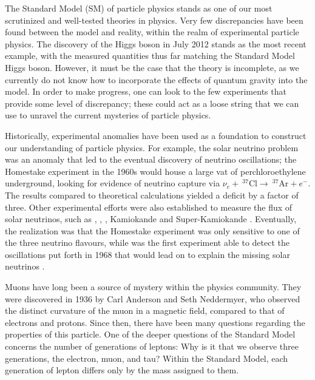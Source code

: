 \label{chapter:introduction}

The Standard Model (SM) of particle physics stands as one of our most scrutinized and well-tested theories in physics.
Very few discrepancies have been found between the model and reality, within the realm of experimental particle physics.
The discovery of the Higgs boson in July 2012 stands as the most recent example, with the measured quantities thus far matching the Standard Model Higgs boson.
However, it must be the case that the theory is incomplete, as we currently do not know how to incorporate the effects of quantum gravity into the model.
In order to make progress, one can look to the few experiments that provide some level of discrepancy; these could act as a loose string that we can use to unravel the current mysteries of particle physics.

Historically, experimental anomalies have been used as a foundation to construct our understanding of particle physics.
For example, the solar neutrino problem was an anomaly that led to the eventual discovery of neutrino oscillations; the Homestake experiment \cite{Davis:1968cp} in the 1960s would house a large vat of perchloroethylene underground, looking for evidence of neutrino capture via $\nu_e +~^{37}\textrm{Cl} \rightarrow~^{37}\textrm{Ar} + e^-$.
The results compared to theoretical calculations yielded a deficit by a factor of three.
Other experimental efforts were also established to measure the flux of solar neutrinos, such as \sage \cite{Abdurashitov:1999zd}, \gallex \cite{Hampel:1998xg}, \sno \cite{Boger:1999bb}, Kamiokande and Super-Kamiokande \cite{Fukuda:1996sz, Fukuda:2002pe}.
Eventually, the realization was that the Homestake experiment was only sensitive to one of the three neutrino flavours, while \sno was the first experiment able to detect the oscillations put forth in 1968 that would lead on to explain the missing solar neutrinos \cite{Gribov:1968kq}.

Muons have long been a source of mystery within the physics community.
They were discovered in 1936 by Carl Anderson and Seth Neddermyer, who observed the distinct curvature of the muon in a magnetic field, compared to that of electrons and protons. Since then, there have been many questions regarding the properties of this particle.
One of the deeper questions of the Standard Model concerns the number of generations of leptons: Why is it that we observe three generations, the electron, muon, and tau? Within the Standard Model, each generation of lepton differs only by the mass assigned to them.

